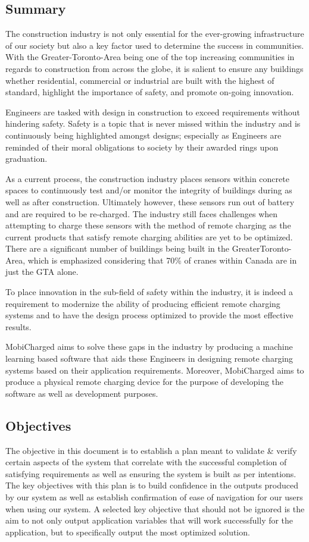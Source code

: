 \documentclass[12pt, titlepage]{article}
\begin{document}
\subsection{Summary}
The construction industry is not only essential for the ever-growing infrastructure of our society but also a key factor used to determine the success in communities. With the Greater-Toronto-Area being one of the top increasing communities in regards to construction from across the globe, it is salient to ensure any buildings whether residential, commercial or industrial are built with the highest of standard, highlight the importance of safety, and promote on-going innovation. 
\par
Engineers are tasked with design in construction to exceed requirements without hindering safety. Safety is a topic that is never missed within the industry and is continuously being highlighted amongst designs; especially as Engineers are reminded of their moral obligations to society by their awarded rings upon graduation. 
\par
As a current process, the construction industry places sensors within concrete spaces to continuously test and/or monitor the integrity of buildings during as well as after construction. Ultimately however, these sensors run out of battery and are required to be re-charged. The industry still faces challenges when attempting to charge these sensors with the method of remote charging as the current products that satisfy remote charging abilities are yet to be optimized. There are a significant number of buildings being built in the GreaterToronto-Area, which is emphasized considering that 70\% of cranes within Canada are in just the GTA alone. 
\par
To place innovation in the sub-field of safety within the industry, it is indeed a requirement to modernize the ability of producing efficient remote charging systems and to have the design process optimized to provide the most effective results. 
\par
MobiCharged aims to solve these gaps in the industry by producing a machine learning based software that aids these Engineers in designing remote charging systems based on their application requirements. Moreover, MobiCharged aims to produce a physical remote charging device for the purpose of developing the software as well as development purposes.


\subsection{Objectives}
The objective in this document is to establish a plan meant to validate \& verify certain aspects of the system that correlate with the successful completion of satisfying requirements as well as ensuring the system is built as per intentions. The key objectives with this plan is to build confidence in the outputs produced by our system as well as establish confirmation of ease of navigation for our users when using our system. A selected key objective that should not be ignored is the aim to not only output application variables that will work successfully for the application, but to specifically output the most optimized solution. 
\end{document}
